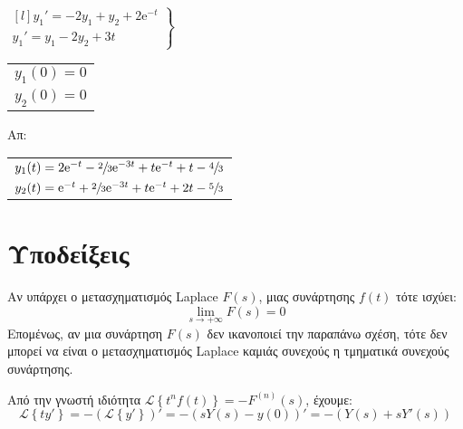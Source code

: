 \begin{enumerate}
\begin{enumerate}[i)]
        $ 
        \left.
          \begin{matrix*}[l]
            y_{1}' = -2 y_{1}+ y_{2}+ 2 \mathrm{e}^{-t} \\
            y_{1}' = y_{1}- 2 y_{2}+3t
          \end{matrix*} 
        \right\} $ \quad {} \quad 
        \begin{tabular}{l}
          $y_{1}(0)=0$ \\
          $y_{2}(0) =0$
        \end{tabular} 
        \hfill Απ: 
        \begin{tabular}{l}
          $ y_{1}(t) = 2 \mathrm{e}^{-t} -\sfrac{2}{3} \mathrm{e}^{-3t} + t \mathrm{e}^{-t} +t
          -\sfrac{4}{3} $
          \\
          $ y_{2}(t) = \mathrm{e}^{-t} + \sfrac{2}{3} \mathrm{e}^{-3t} + t \mathrm{e}^{-t}
          +2t - \sfrac{5}{3} $
        \end{tabular}

         
    \end{enumerate}
\end{enumerate}

\vspace{\baselineskip}

\section*{Υποδείξεις}

\begin{rem}
  Αν υπάρχει ο μετασχηματισμός Laplace $F(s)$, μιας 
  συνάρτησης $f(t)$ τότε ισχύει:
  \[
    \lim\limits_{s\to+\infty}F(s)=0
  \]
  Επομένως, αν μια συνάρτηση $F(s)$ δεν ικανοποιεί την παραπάνω σχέση, τότε δεν 
  μπορεί να είναι ο μετασχηματισμός Laplace καμιάς συνεχούς η τμηματικά 
  συνεχούς συνάρτησης.
\end{rem}

\begin{rem}
  Από την γνωστή ιδιότητα $ \mathcal{L}\left\{t^{n}f(t)\right\} = - F^{(n)}(s) $, 
  έχουμε:
  \[
    \mathcal{L}\left\{ty'\right\} = - (\mathcal{L}\left\{y'\right\})' = - (sY(s)-y(0))' =
    -(Y(s)+sY'(s))
  \] 
\end{rem}



